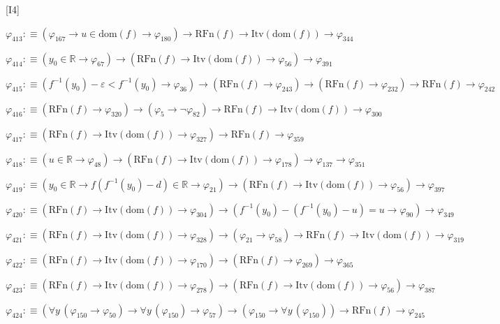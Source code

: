 \begin{fullproof}{[I4]}
\begin{abbrevlist}
\item $\varphi_{413} :\equiv (\varphi_{167} \to u \in \mathrm{dom}(f) \to \varphi_{180}) \to \mathrm{RFn}(f) \to \mathrm{Itv}(\mathrm{dom}(f)) \to \varphi_{344}$
\item $\varphi_{414} :\equiv (y_{0} \in \mathbb{R} \to \varphi_{67}) \to (\mathrm{RFn}(f) \to \mathrm{Itv}(\mathrm{dom}(f)) \to \varphi_{56}) \to \varphi_{391}$
\item $\varphi_{415} :\equiv (f^{-1}(y_{0}) - \varepsilon < f^{-1}(y_{0}) \to \varphi_{36}) \to (\mathrm{RFn}(f) \to \varphi_{243}) \to (\mathrm{RFn}(f) \to \varphi_{232}) \to \mathrm{RFn}(f) \to \varphi_{242}$
\item $\varphi_{416} :\equiv (\mathrm{RFn}(f) \to \varphi_{320}) \to (\varphi_{5} \to \neg \varphi_{82}) \to \mathrm{RFn}(f) \to \mathrm{Itv}(\mathrm{dom}(f)) \to \varphi_{300}$
\item $\varphi_{417} :\equiv (\mathrm{RFn}(f) \to \mathrm{Itv}(\mathrm{dom}(f)) \to \varphi_{327}) \to \mathrm{RFn}(f) \to \varphi_{359}$
\item $\varphi_{418} :\equiv (u \in \mathbb{R} \to \varphi_{48}) \to (\mathrm{RFn}(f) \to \mathrm{Itv}(\mathrm{dom}(f)) \to \varphi_{178}) \to \varphi_{137} \to \varphi_{351}$
\item $\varphi_{419} :\equiv (y_{0} \in \mathbb{R} \to f(f^{-1}(y_{0}) - d) \in \mathbb{R} \to \varphi_{21}) \to (\mathrm{RFn}(f) \to \mathrm{Itv}(\mathrm{dom}(f)) \to \varphi_{56}) \to \varphi_{397}$
\item $\varphi_{420} :\equiv (\mathrm{RFn}(f) \to \mathrm{Itv}(\mathrm{dom}(f)) \to \varphi_{304}) \to (f^{-1}(y_{0}) - (f^{-1}(y_{0}) - u) = u \to \varphi_{90}) \to \varphi_{349}$
\item $\varphi_{421} :\equiv (\mathrm{RFn}(f) \to \mathrm{Itv}(\mathrm{dom}(f)) \to \varphi_{328}) \to (\varphi_{21} \to \varphi_{58}) \to \mathrm{RFn}(f) \to \mathrm{Itv}(\mathrm{dom}(f)) \to \varphi_{319}$
\item $\varphi_{422} :\equiv (\mathrm{RFn}(f) \to \mathrm{Itv}(\mathrm{dom}(f)) \to \varphi_{170}) \to (\mathrm{RFn}(f) \to \varphi_{269}) \to \varphi_{365}$
\item $\varphi_{423} :\equiv (\mathrm{RFn}(f) \to \mathrm{Itv}(\mathrm{dom}(f)) \to \varphi_{278}) \to (\mathrm{RFn}(f) \to \mathrm{Itv}(\mathrm{dom}(f)) \to \varphi_{56}) \to \varphi_{387}$
\item $\varphi_{424} :\equiv (\forall y\,(\varphi_{150} \to \varphi_{50}) \to \forall y\,(\varphi_{150}) \to \varphi_{57}) \to (\varphi_{150} \to \forall y\,(\varphi_{150})) \to \mathrm{RFn}(f) \to \varphi_{245}$

\end{abbrevlist}
\end{fullproof}

